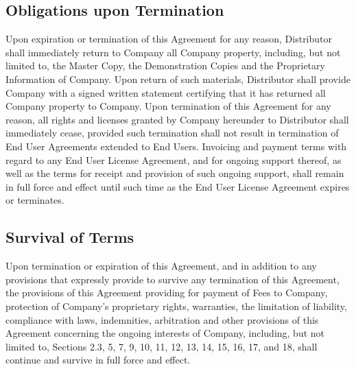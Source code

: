\documentclass[letterpaper,10pt,openany,oneside,english]{sphinxmanual}
\begin{document}
\subsection{Obligations upon Termination}
\label{\detokenize{terminiation:obligations-upon-termination}}
Upon expiration or termination of this Agreement for any reason, Distributor shall immediately return to Company all Company property, including, but not limited to, the Master Copy, the Demonstration Copies and the Proprietary Information of Company. Upon return of such materials, Distributor shall provide Company with a signed written statement certifying that it has returned all Company property to Company. Upon termination of this Agreement for any reason, all rights and licenses granted by Company hereunder to Distributor shall immediately cease, provided such termination shall not result in termination of End User Agreements extended to End Users. Invoicing and payment terms with regard to any End User License Agreement, and for ongoing support thereof, as well as the terms for receipt and provision of such ongoing support, shall remain in full force and effect until such time as the End User License Agreement expires or terminates.


\subsection{Survival of Terms}
\label{\detokenize{terminiation:survival-of-terms}}
Upon termination or expiration of this Agreement, and in addition to any provisions that expressly provide to survive any termination of this Agreement, the provisions of this Agreement providing for payment of Fees to Company, protection of Company’s proprietary rights, warranties, the limitation of liability, compliance with laws, indemnities, arbitration and other provisions of this Agreement concerning the ongoing interests of Company, including, but not limited to, Sections 2.3, 5, 7, 9, 10, 11, 12, 13, 14, 15, 16, 17, and 18, shall continue and survive in full force and effect.
\end{document}
